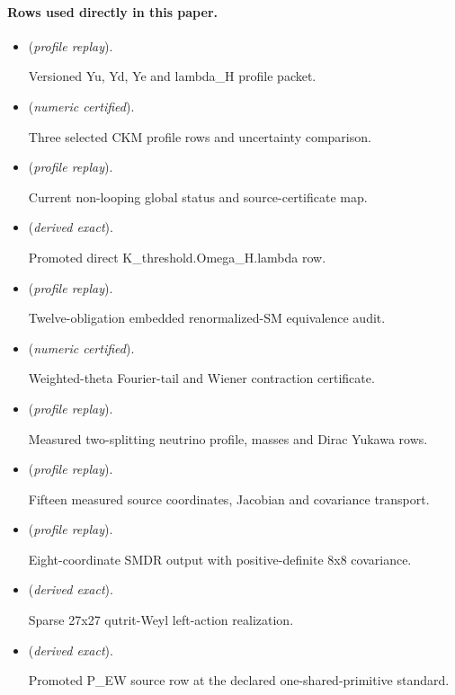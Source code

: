 \documentclass[11pt]{article}
\begin{document}
\paragraph{Rows used directly in this paper.}
\begin{itemize}
\setlength{\itemsep}{0.25em}
\item {} (\emph{profile replay}).\par Versioned Yu, Yd, Ye and lambda\_H profile packet.
\item {} (\emph{numeric certified}).\par Three selected CKM profile rows and uncertainty comparison.
\item {} (\emph{profile replay}).\par Current non-looping global status and source-certificate map.
\item {} (\emph{derived exact}).\par Promoted direct K\_threshold.Omega\_H.lambda row.
\item {} (\emph{profile replay}).\par Twelve-obligation embedded renormalized-SM equivalence audit.
\item {} (\emph{numeric certified}).\par Weighted-theta Fourier-tail and Wiener contraction certificate.
\item {} (\emph{profile replay}).\par Measured two-splitting neutrino profile, masses and Dirac Yukawa rows.
\item {} (\emph{profile replay}).\par Fifteen measured source coordinates, Jacobian and covariance transport.
\item {} (\emph{profile replay}).\par Eight-coordinate SMDR output with positive-definite 8x8 covariance.
\item {} (\emph{derived exact}).\par Sparse 27x27 qutrit-Weyl left-action realization.
\item {} (\emph{derived exact}).\par Promoted P\_EW source row at the declared one-shared-primitive standard.
\end{itemize}
\end{document}
